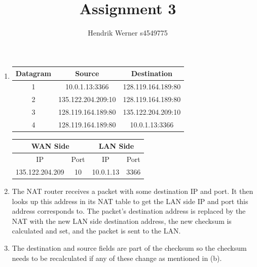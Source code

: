 \documentclass[12pt, a4paper]{article}
\title{Assignment 3}
\author{Hendrik Werner s4549775}
\begin{document}
\maketitle

\section{} %
\begin{enumerate}[a]
	\item %
	\begin{tabular}{|c|c|c|}
		\hline
		Datagram & Source & Destination\\\hline
		1 & 10.0.1.13:3366 & 128.119.164.189:80\\
		2 & 135.122.204.209:10 & 128.119.164.189:80\\
		3 & 128.119.164.189:80 & 135.122.204.209:10\\
		4 & 128.119.164.189:80 & 10.0.1.13:3366\\
		\hline
	\end{tabular}

	\begin{tabular}{|c|c|c|c|}
		\hline
		\multicolumn{2}{|c|}{WAN Side} & \multicolumn{2}{|c|}{LAN Side}\\\hline
		IP & Port & IP & Port\\\hline
		135.122.204.209 & 10 & 10.0.1.13 & 3366\\
		\hline
	\end{tabular}

	\item %
	The NAT router receives a packet with some destination IP and port. It then looks up this address in its NAT table to get the LAN side IP and port this address corresponds to. The packet's destination address is replaced by the NAT with the new LAN side destination address, the new checksum is calculated and set, and the packet is sent to the LAN.

	\item %
	The destination and source fields are part of the checksum so the checksum needs to be recalculated if any of these change as mentioned in (b).

\end{enumerate}
\end{document}
